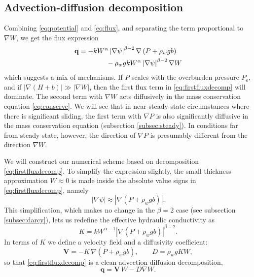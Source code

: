 \documentclass[gmd]{copernicus}   %
\newcommand\bV{\mathbf{V}}
\newcommand\bq{\mathbf{q}}
\newcommand{\grad}{\nabla}
\begin{document}
\subsection{Advection-diffusion decomposition}  \label{subsec:advectdiffus}  Combining \eqref{eq:potential} and \eqref{eq:flux}, and separating the term proportional to $\grad W$, we get the flux expression
\begin{align}
\bq &= - k  W^\alpha \left|\grad \psi\right|^{\beta-2} \grad \left(P + \rho_w g b\right)  \label{eq:firstfluxdecomp} \\
    &\qquad\qquad - \rho_w g k W^\alpha \left|\grad \psi\right|^{\beta-2} \grad W  \notag
\end{align}
which suggests a mix of mechanisms.  If $P$ scales with the overburden pressure $P_o$, and if $|\grad (H+b)| \gg |\grad W|$, then the first flux term in \eqref{eq:firstfluxdecomp} will dominate.  The second term with $\grad W$ acts diffusively in the mass conservation equation \eqref{eq:conserve}.  We will see that in near-steady-state circumstances where there is significant sliding, the first term with $\grad P$ is also significantly diffusive in the mass conservation equation (subsection \ref{subsec:steady}).  In conditions far from steady state, however, the direction of $\grad P$ is presumably different from the direction $\grad W$.

We will construct our numerical scheme based on decomposition \eqref{eq:firstfluxdecomp}.  To simplify the expression slightly, the small thickness approximation $W\approx 0$ is made inside the absolute value signs in \eqref{eq:firstfluxdecomp}, namely
\begin{equation}
\left|\grad \psi\right| \approx \left|\grad \left(P + \rho_w g b \right)\right|.  \label{eq:Wsmall}
\end{equation}
This simplification, which makes no change in the $\beta=2$ case (see subsection \ref{subsec:darcy}), lets us redefine the effective hydraulic conductivity as
\begin{equation}
K = k W^{\alpha-1} \left|\grad(P+\rho_w g b)\right|^{\beta - 2}. \label{eq:Kdefine}
\end{equation}
In terms of $K$ we define a velocity field and a diffusivity coefficient:
\begin{equation} \label{eq:vexpression}
  \bV = - K\, \grad \left(P + \rho_w g b\right), \qquad D = \rho_w g K W,
\end{equation}
so that \eqref{eq:firstfluxdecomp} is a clean advection-diffusion decomposition,
\begin{equation} \label{eq:qexpression}
  \bq = \bV\, W - D \grad W.
\end{equation}
\end{document}
